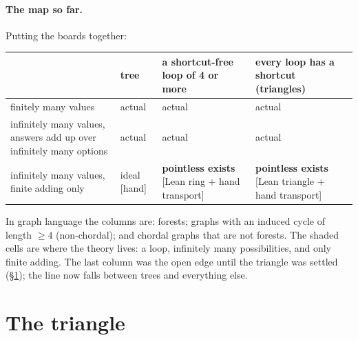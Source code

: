 \documentclass[11pt]{article}
\theoremstyle{plain}
\theoremstyle{definition}
\newcommand{\st}[1]{\textsf{\small[#1]}}
\begin{document}
\paragraph{The map so far.} Putting the boards together:
\begin{center}\small
\begin{tabular}{|>{\raggedright\arraybackslash}p{3.6cm}|>{\raggedright\arraybackslash}p{3cm}|>{\raggedright\arraybackslash}p{3.2cm}|>{\raggedright\arraybackslash}p{3.2cm}|}
\hline
& \textbf{tree} & \textbf{a shortcut-free loop of 4 or more} & \textbf{every loop has a shortcut} (triangles)\\
\hline
finitely many values & actual & actual & actual\\
\hline
infinitely many values, answers add up over infinitely many options & actual & actual & actual\\
\hline
infinitely many values, finite adding only & ideal \st{hand} & \cellcolor{orange!20}\textbf{pointless exists} \st{Lean ring + hand transport} & \cellcolor{orange!20}\textbf{pointless exists} \st{Lean triangle + hand transport}\\
\hline
\end{tabular}
\end{center}
\noindent In graph language the columns are: forests; graphs with an induced cycle
of length $\ge4$ (non-chordal); and chordal graphs that are not forests. The
shaded cells are where the theory lives: a loop, infinitely many possibilities,
and only finite adding. The last column was the open edge until the triangle
was settled (\S\ref{sec:triangle}); the line now falls between trees and
everything else.

\section{The triangle}\label{sec:triangle}
\end{document}
